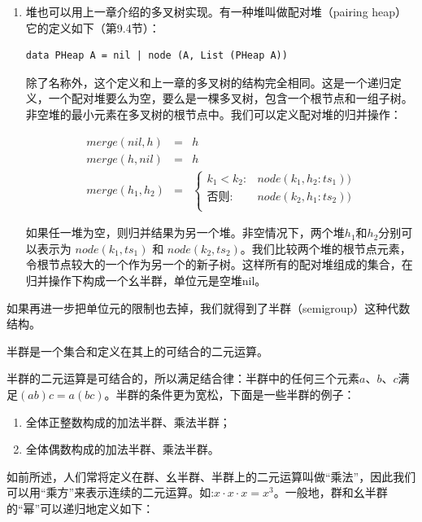 \documentclass{article}
\begin{document}
\begin{enumerate}
\item 堆也可以用上一章介绍的多叉树实现。有一种堆叫做配对堆（pairing heap）它的定义如下（\cite{LiuXinyu2017}第9.4节）：

\begin{lstlisting}
data PHeap A = nil | node (A, List (PHeap A))
\end{lstlisting}

除了名称外，这个定义和上一章的多叉树的结构完全相同。这是一个递归定义，一个配对堆要么为空，要么是一棵多叉树，包含一个根节点和一组子树。非空堆的最小元素在多叉树的根节点中。我们可以定义配对堆的归并操作：

\[
\begin{array}{rcl}
merge(nil, h) & = & h \\
merge(h, nil) & = & h \\
merge(h_1, h_2) & = &
  \begin{cases}
  k_1 < k_2 : & node(k_1, h_2 : ts_1)) \\
  \text{否则} : & node(k_2, h_1 : ts_2)) \\
  \end{cases}
\end{array}
\]

如果任一堆为空，则归并结果为另一个堆。非空情况下，两个堆$h_1$和$h_2$分别可以表示为 $node(k_1, ts_1)$ 和 $node(k_2, ts_2)$。我们比较两个堆的根节点元素，令根节点较大的一个作为另一个的新子树。这样所有的配对堆组成的集合，在归并操作下构成一个幺半群，单位元是空堆nil。

\end{enumerate}

如果再进一步把单位元的限制也去掉，我们就得到了半群（semigroup）这种代数结构。

\begin{definition}
半群是一个集合和定义在其上的可结合的二元运算。
\end{definition}

半群的二元运算是可结合的，所以满足结合律：半群中的任何三个元素$a$、$b$、$c$满足$(ab)c = a(bc)$。半群的条件更为宽松，下面是一些半群的例子：

\begin{enumerate}
\item 全体正整数构成的加法半群、乘法半群；
\item 全体偶数构成的加法半群、乘法半群。
\end{enumerate}

如前所述，人们常将定义在群、幺半群、半群上的二元运算叫做“乘法”，因此我们可以用“乘方”来表示连续的二元运算。如:$x \cdot x \cdot x = x^3$。一般地，群和幺半群的“幂”可以递归地定义如下：
\end{document}
